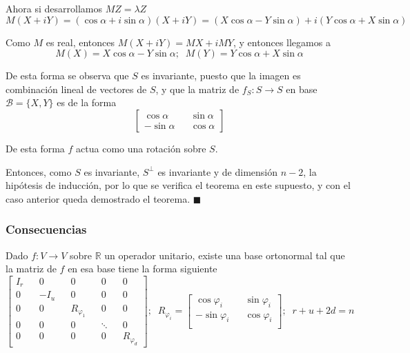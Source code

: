 \documentclass{preset}
\begin{document}
\noindent Ahora si desarrollamos $MZ=\lambda Z$
\vspace{-10pt}
\[M(X+iY)=(\cos \alpha + i \sin \alpha)(X+iY)=(X \cos \alpha - Y \sin \alpha) + i(Y \cos \alpha + X \sin \alpha)\]
\vspace{-30pt}

\noindent Como $M$ es real, entonces $M(X+iY)=MX +iMY$, y entonces llegamos a 
\vspace{-10pt}
\[M(X)=X \cos \alpha - Y \sin \alpha; \;\; M(Y)=Y \cos \alpha + X \sin \alpha\]
\vspace{-30pt}

De esta forma se observa que $S$ es invariante, puesto que la imagen es combinación lineal de vectores de $S$, y que la matriz de $f_S : S\rightarrow S$ en base $\mathcal{B}=\{X,Y\}$ es de la forma
\vspace{-7pt}
\[\left[\begin{matrix}
\cos{\alpha} && \sin{\alpha} \\
-\sin{\alpha} && \cos{\alpha}
\end{matrix}\right]\]
\vspace{-15pt}

\noindent De esta forma $f$ actua como una rotación sobre $S$.

\noindent Entonces, como $S$ es invariante, $S^\perp$ es invariante y de dimensión $n-2$, la hipótesis de inducción, por lo que se verifica el teorema en este supuesto, y con el caso anterior queda demostrado el teorema.  $\blacksquare$
\clearpage
\subsubsection{Consecuencias}

Dado $f: V \rightarrow V$ sobre $\mathbb{R}$ un operador unitario, existe una base ortonormal tal que la matriz de $f$ en esa base tiene la forma siguiente
\vspace{-7pt}
\[\left[\begin{matrix}
I_r && 0  && 0 && 0 &&0\\
0 && -I_u && 0 && 0 && 0\\
0 && 0 && R_{\varphi_1}&& 0 && 0\\
0 && 0 && 0 && \ddots && 0\\
0 && 0 && 0 && 0 && R_{\varphi_d}
\end{matrix}\right]; \;\;
R_{\varphi_i}=\left[\begin{matrix}
\cos{\varphi_i} && \sin{\varphi_i}  \\
-\sin{\varphi_i} && \cos{\varphi_i}\\
\end{matrix}\right]; \;\; r+u+2d=n\]
\vspace{-15pt}
\end{document}
